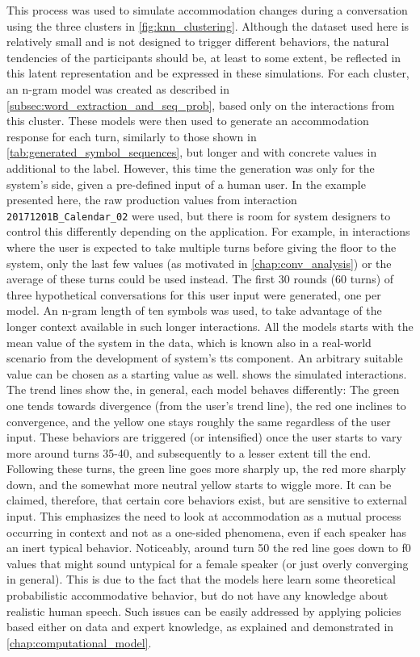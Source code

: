 This process was used to simulate accommodation changes during a conversation using the three clusters in \cref{fig:knn_clustering}.
Although the dataset used here is relatively small and is not designed to trigger different behaviors, the natural tendencies of the participants should be, at least to some extent, be reflected in this latent representation and be expressed in these simulations.
For each cluster, an n-gram model was created as described in \cref{subsec:word_extraction_and_seq_prob}, based only on the interactions from this cluster.
These models were then used to generate an accommodation response for each turn, similarly to those shown in \cref{tab:generated_symbol_sequences}, but longer and with concrete values in additional to the label.
However, this time the generation was only for the system's side, given a pre-defined input of a human user.
In the example presented here, the raw production values from interaction \texttt{20171201B\_Calendar\_02} were used, but there is room for system designers to control this differently depending on the application.
For example, in interactions where the user is expected to take multiple turns before giving the floor to the system, only the last few values (as motivated in \cref{chap:conv_analysis}) or the average of these turns could be used instead.
The first 30 rounds (60 turns) of three hypothetical conversations for this user input were generated, one per model.
An n-gram length of ten symbols was used, to take advantage of the longer context available in such longer interactions.
All the models starts with the mean value of the system in the data, which is known also in a real-world scenario from the development of system's \ac{tts} component.
An arbitrary suitable value can be chosen as a starting value as well.
 shows the simulated interactions.
The trend lines show the, in general, each model behaves differently:
The green one tends towards divergence (from the user's trend line), the red one inclines to convergence, and the yellow one stays roughly the same regardless of the user input.
These behaviors are triggered (or intensified) once the user starts to vary more around turns 35-40, and subsequently to a lesser extent till the end.
Following these turns, the green line goes more sharply up, the red more sharply down, and the somewhat more neutral yellow starts to wiggle more.
It can be claimed, therefore, that certain core behaviors exist, but are sensitive to external input.
This emphasizes the need to look at accommodation as a mutual process occurring in context and not as a one-sided phenomena, even if each speaker has an inert typical behavior.
Noticeably, around turn 50 the red line goes down to \ac{f0} values that might sound untypical for a female speaker (or just overly converging in general).
This is due to the fact that the models here learn some theoretical probabilistic accommodative behavior, but do not have any knowledge about realistic human speech.
Such issues can be easily addressed by applying policies based either on data and expert knowledge, as explained and demonstrated in \cref{chap:computational_model}.